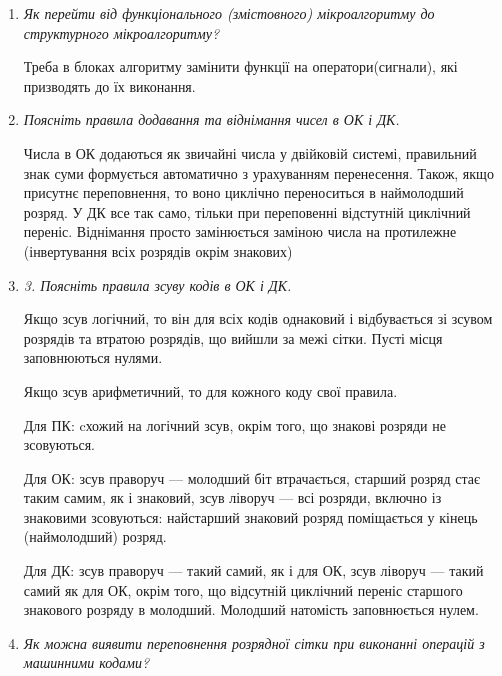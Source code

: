\documentclass[12pt,a4paper]{article}
\begin{document}
    \begin{enumerate}
        \item \textit{Як перейти від функціонального (змістовного) мікроалгоритму до структурного мікроалгоритму?}
        
        Треба в блоках алгоритму замінити функції на оператори(сигнали), які призводять до їх виконання.
        \vspace{1em}

        \item \textit{Поясніть правила додавання та віднімання чисел в ОК і ДК.}
        
        Числа в ОК додаються як звичайні числа у двійковій системі, правильний знак суми формується автоматично з урахуванням перенесення. Також, якщо присутнє переповнення, то воно циклічно переноситься в наймолодший розряд.
        У ДК все так само, тільки при переповенні відстутній циклічний переніс. Віднімання просто замінюється заміною числа на протилежне (інвертування всіх розрядів окрім знакових)
        \vspace{1em}

        \item \textit{3. Поясніть правила зсуву кодів в ОК і ДК.}
        
        Якщо зсув логічний, то він для всіх кодів однаковий і відбувається зі зсувом розрядів та втратою розрядів, що вийшли за межі сітки. Пусті місця заповнюються нулями.

        Якщо зсув арифметичний, то для кожного коду свої правила.
        
        Для ПК: cхожий на логічний зсув, окрім того, що знакові розряди не зсовуються.

        Для ОК: зсув праворуч --- молодший біт втрачається, старший розряд стає таким самим, як і знаковий, зсув ліворуч --- всі розряди, включно із знаковими зсовуються: найстарший знаковий розряд поміщається у кінець (наймолодший) розряд.

        Для ДК: зсув праворуч --- такий самий, як і для ОК, зсув ліворуч --- такий самий як для ОК, окрім того, що відсутній циклічний переніс старшого знакового розряду в молодший. Молодший натомість заповнюється нулем.

        \vspace{1em}

        \item \textit{Як можна виявити переповнення розрядної сітки при виконанні операцій з машинними кодами?}
        

\end{enumerate}
\end{document}
